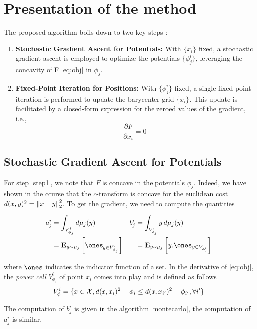 \section{Presentation of the method}
\label{sec:method}

The proposed algorithm \cite{claici_stochastic_2018} boils down to two key steps :
\begin{enumerate}
    \item \label{step1} \textbf{Stochastic Gradient Ascent for Potentials:} With $\lbrace x_i \rbrace$ fixed, a stochastic gradient ascent is employed to optimize the potentials $\lbrace \phi_j^i \rbrace$, leveraging the concavity of F \eqref{eq:obj} in $\phi_j$.
    \item \textbf{Fixed-Point Iteration for Positions:} With $\lbrace \phi_j^i \rbrace$ fixed, a single fixed point iteration is performed to update the barycenter grid $\lbrace x_i \rbrace$. This update is facilitated by a closed-form expression for the zeroed values of the gradient, i.e., $$\frac{\partial F}{\partial x_i} = 0$$
\end{enumerate}

\subsection{Stochastic Gradient Ascent for Potentials}

For step \ref{step1}, we note that $F$ is concave in the potentials $\phi_j$. Indeed, we have shown in the course \cite{peyre_computational_2020} that the $c$-transform is concave for the euclidean cost $d(x, y)^2 = \left\lVert x - y\right\rVert_2^2$. 
To get the gradient, we need to compute the quantities 


\begin{align*}
    a^i_j &= \int_{V_{\phi_j}^i} d\mu_j(y) & b_j^i &= \int_{V_{\phi_j}^i} y\, d\mu_j(y) \\
     &= \E_{y \sim \mu_j}\left[ \ones_{y\in V_{\phi_j}^i}\right] & & =\E_{y \sim \mu_j}\left[ y . \ones_{y\in V_{\phi_j^i}}\right] \\
\end{align*}

where $\ones$ indicates the indicator function of a set. In the derivative of \eqref{eq:obj}, the \textit{power cell} $V_{\phi_j}^i$ of point $x_i$ comes into play and is defined as follows
$$
V_{\phi}^i = \lbrace x\in\mathcal{X}, d(x, x_i)^2 - \phi_i \leq d(x, x_{i'})^2 - \phi_{i'}, \forall i'  \rbrace
$$

The computation of $b_j^i$ is given in the algorithm \ref{montecarlo}, the computation of $a_j^i$ is similar. 

